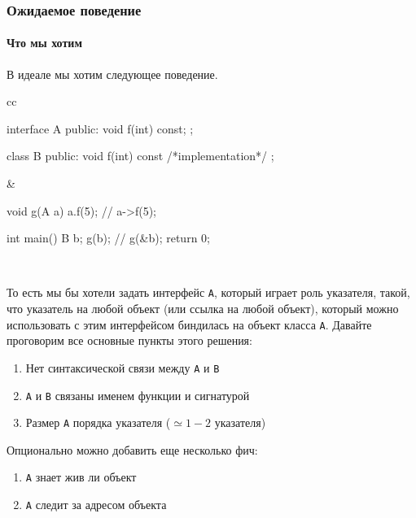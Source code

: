\subsubsection{Ожидаемое поведение}

\paragraph{Что мы хотим}

В идеале мы хотим следующее поведение.
\begin{center}
\begin{tabular}{cc}
{
\begin{minipage}[\baselineskip]{9cm}
\begin{cppcode}[numbers = none]
interface A {
public:
  void f(int) const;
};

class B {
public:
   void f(int) const { /*implementation*/ }
};
\end{cppcode}
\end{minipage}
}&{
\begin{minipage}[\baselineskip]{5cm}
\begin{cppcode}[numbers = none]
void g(A a) {
  a.f(5); // a->f(5);
}

int main() {
  B b;
  g(b); // g(&b);
  return 0;
}
\end{cppcode}
\end{minipage}
}\\
\end{tabular}
\end{center}
То есть мы бы хотели задать интерфейс \texttt{A}, который играет роль указателя, такой, что указатель на любой объект (или ссылка на любой объект), который можно использовать с этим интерфейсом биндилась на объект класса \texttt{A}.
Давайте проговорим все основные пункты этого решения:
\begin{enumerate}
\item Нет синтаксической связи между \texttt{A} и \texttt{B}

\item \texttt{A} и \texttt{B} связаны именем функции и сигнатурой

\item Размер \texttt{A} порядка указателя ($\simeq 1-2$ указателя)
\end{enumerate}
Опционально можно добавить еще несколько фич:
\begin{enumerate}
\item \texttt{A} знает жив ли объект

\item \texttt{A} следит за адресом объекта
\end{enumerate}

